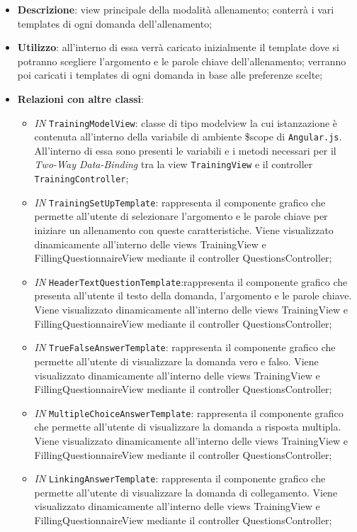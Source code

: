 \begin{itemize}
	\item \textbf{Descrizione}: view principale della modalità allenamento; conterrà i vari templates di ogni domanda dell'allenamento;
	\item \textbf{Utilizzo}: all'interno di essa verrà caricato inizialmente il template dove si potranno scegliere l'argomento e le parole chiave dell'allenamento; verranno poi caricati i templates di ogni domanda in base alle preferenze scelte; 
	\item \textbf{Relazioni con altre classi}:
	\begin{itemize}
		\item \textit{IN} \texttt{TrainingModelView}: classe di tipo modelview la cui istanzazione è contenuta all'interno della variabile di ambiente \$scope di \texttt{Angular.js}. All'interno di essa sono presenti le variabili e i metodi necessari per il \textit{Two-Way Data-Binding} tra la view \texttt{TrainingView} e il controller \texttt{TrainingController};
		\item \textit{IN} \texttt{TrainingSetUpTemplate}: rappresenta il componente grafico che permette all'utente di selezionare l'argomento e le parole chiave per iniziare un allenamento con queste caratteristiche. Viene visualizzato	dinamicamente all'interno delle views TrainingView e FillingQuestionnaireView mediante il controller QuestionsController;
		\item \textit{IN} \texttt{HeaderTextQuestionTemplate}:rappresenta il componente grafico che presenta all'utente il testo della domanda, l'argomento e le parole chiave. Viene visualizzato dinamicamente all'interno delle views TrainingView e FillingQuestionnaireView mediante il controller QuestionsController;
		\item \textit{IN} \texttt{TrueFalseAnswerTemplate}: rappresenta il componente grafico che permette all'utente di visualizzare la domanda vero e falso. Viene visualizzato dinamicamente all'interno delle views TrainingView e FillingQuestionnaireView mediante il controller QuestionsController;
		\item \textit{IN} \texttt{MultipleChoiceAnswerTemplate}: rappresenta il componente grafico che permette all'utente di visualizzare la domanda a risposta multipla. Viene visualizzato dinamicamente all'interno delle views TrainingView e FillingQuestionnaireView mediante il controller QuestionsController;
		\item \textit{IN} \texttt{LinkingAnswerTemplate}: rappresenta il componente grafico che permette all'utente di visualizzare la domanda di collegamento. Viene visualizzato dinamicamente all'interno delle views TrainingView e FillingQuestionnaireView mediante il controller QuestionsController;

\end{itemize}
\end{itemize}

